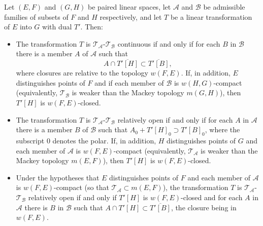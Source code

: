 \begin{theorem}
\label{thm:21.3}
Let $(E,F)$ and $(G,H)$ be paired linear spaces, let $\mathcal{A}$ and $\mathcal{B}$ be admissible families of subsets of $F$ and $H$ respectively, and let $T$ be a linear transformation of $E$ into $G$ with dual $T'$. Then:

\begin{itemize}
\item[(i)] The transformation $T$ is $\mathcal{T}_{\mathcal{A}}$-$\mathcal{T}_{\mathcal{B}}$ continuous if and only if for each $B$ in $\mathcal{B}$ there is a member $A$ of $\mathcal{A}$ such that
$$A \cap \overline{T'[H]} \subset \overline{T'[B]},$$
where closures are relative to the topology $w(F,E)$. If, in addition, $E$ distinguishes points of $F$ and if each member of $\mathcal{B}$ is $w(H,G)$-compact (equivalently, $\mathcal{T}_{\mathcal{B}}$ is weaker than the Mackey topology $m(G,H)$), then $T'[H]$ is $w(F,E)$-closed.

\item[(ii)] The transformation $T$ is $\mathcal{T}_{\mathcal{A}}$-$\mathcal{T}_{\mathcal{B}}$ relatively open if and only if for each $A$ in $\mathcal{A}$ there is a member $B$ of $\mathcal{B}$ such that $A_0 + T'[H]_0 \supset T'[B]_0$, where the subscript $0$ denotes the polar. If, in addition, $H$ distinguishes points of $G$ and each member of $\mathcal{A}$ is $w(F,E)$-compact (equivalently, $\mathcal{T}_{\mathcal{A}}$ is weaker than the Mackey topology $m(E,F)$), then $T'[H]$ is $w(F,E)$-closed.

\item[(iii)] Under the hypotheses that $E$ distinguishes points of $F$ and each member of $\mathcal{A}$ is $w(F,E)$-compact (so that $\mathcal{T}_{\mathcal{A}} \subset m(E,F)$), the transformation $T$ is $\mathcal{T}_{\mathcal{A}}$-$\mathcal{T}_{\mathcal{B}}$ relatively open if and only if $T'[H]$ is $w(F,E)$-closed and for each $A$ in $\mathcal{A}$ there is $B$ in $\mathcal{B}$ such that $A \cap T'[H] \subset \overline{T'[B]}$, the closure being in $w(F,E)$.
\end{itemize}
\end{theorem}
